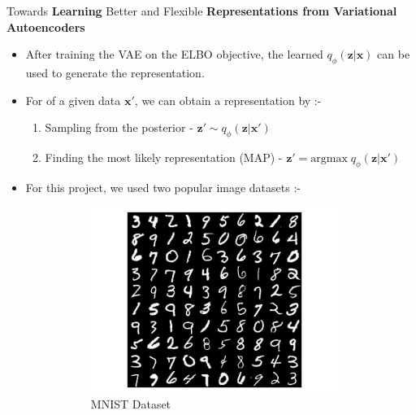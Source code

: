 \documentclass[hyperref={colorlinks,citecolor=blue,linkcolor=blue,urlcolor=blue}]{beamer}
\begin{document}
\begin{frame}{ Towards \textbf{Learning} Better and Flexible \textbf{Representations from Variational Autoencoders} \vspace{0.3em}}
  \begin{itemize}
    \item After training the VAE on the ELBO objective, the learned  $q_{\phi}(\mathbf{z} | \mathbf{x})$ can be used to generate the representation.
    \item For of a given data $\mathbf{x'}$, we can obtain a representation by :- 
    \begin{enumerate}
      \item Sampling from the posterior - $\mathbf{z'} \sim q_{\phi}(\mathbf{z} | \mathbf{x'})$
      \item Finding the most likely representation (MAP) - $\mathbf{z'} = \text{argmax} \; q_{\phi}(\mathbf{z} | \mathbf{x'})$
    \end{enumerate}  
    \item For this project, we used two popular image datasets :-
    \begin{figure}
      \pause
      \begin{subfigure}[b]{0.4\textwidth}
          \centering
          \includegraphics[width=0.95\textwidth,]{./Images/mnist.jpeg}
          \caption{MNIST Dataset}
      \end{subfigure}
      \pause
      \begin{subfigure}[b]{0.4\textwidth}
          \centering

\end{subfigure}
\end{figure}
\end{itemize}
\end{frame}
\end{document}
